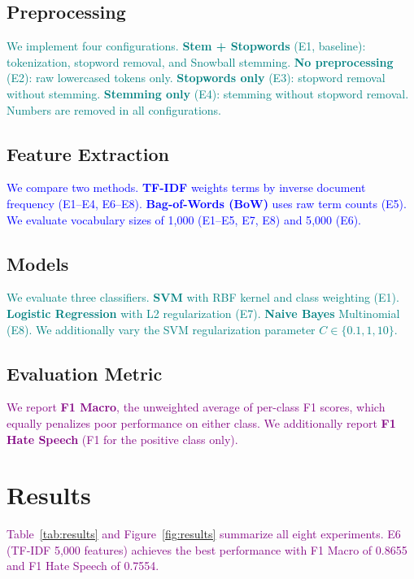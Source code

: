 \documentclass[11pt,a4paper,twocolumn]{article}
\newcommand{\authorone}[1]{\textcolor{blue}{#1}}      %
\newcommand{\authortwo}[1]{\textcolor{teal}{#1}}      %
\newcommand{\joint}[1]{\textcolor{purple}{#1}}        %
\begin{document}
\subsection{Preprocessing}

\authortwo{
We implement four configurations.
\textbf{Stem + Stopwords} (E1, baseline): tokenization, stopword removal,
and Snowball stemming.
\textbf{No preprocessing} (E2): raw lowercased tokens only.
\textbf{Stopwords only} (E3): stopword removal without stemming.
\textbf{Stemming only} (E4): stemming without stopword removal.
Numbers are removed in all configurations.
}

\newpage
\subsection{Feature Extraction}

\authorone{
We compare two methods.
\textbf{TF-IDF} \citep{manning2008} weights terms by inverse document
frequency (E1--E4, E6--E8).
\textbf{Bag-of-Words (BoW)} uses raw term counts (E5).
We evaluate vocabulary sizes of 1{,}000 (E1--E5, E7, E8) and 5{,}000 (E6).
}

\subsection{Models}

\authortwo{
We evaluate three classifiers.
\textbf{SVM} \citep{joachims1998} with RBF kernel and class weighting (E1).
\textbf{Logistic Regression} with L2 regularization (E7).
\textbf{Naive Bayes} Multinomial (E8).
We additionally vary the SVM regularization parameter
$C \in \{0.1, 1, 10\}$.
}

\subsection{Evaluation Metric}

\joint{
We report \textbf{F1 Macro}, the unweighted average of per-class F1 scores,
which equally penalizes poor performance on either class.
We additionally report \textbf{F1 Hate Speech} (F1 for the positive class only).
}

\section{Results}

\joint{
Table~\ref{tab:results} and Figure~\ref{fig:results} summarize all eight
experiments. E6 (TF-IDF 5{,}000 features) achieves the best performance
with F1 Macro of 0.8655 and F1 Hate Speech of 0.7554.
}
\end{document}
